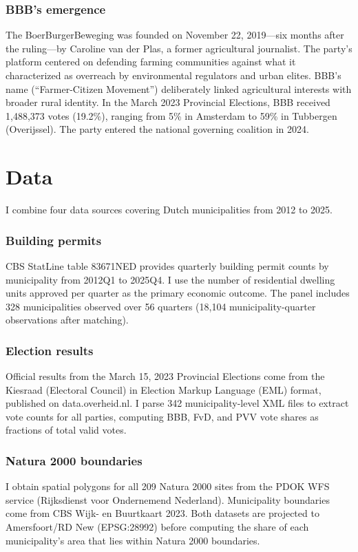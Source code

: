 \documentclass[12pt]{article}
\begin{document}
\subsubsection*{BBB's emergence} The BoerBurgerBeweging was founded on November 22, 2019---six months after the ruling---by Caroline van der Plas, a former agricultural journalist. The party's platform centered on defending farming communities against what it characterized as overreach by environmental regulators and urban elites. BBB's name (``Farmer-Citizen Movement'') deliberately linked agricultural interests with broader rural identity. In the March 2023 Provincial Elections, BBB received 1,488,373 votes (19.2\%), ranging from 5\% in Amsterdam to 59\% in Tubbergen (Overijssel). The party entered the national governing coalition in 2024.

\section{Data}

I combine four data sources covering Dutch municipalities from 2012 to 2025.

\subsubsection*{Building permits} CBS StatLine table 83671NED provides quarterly building permit counts by municipality from 2012Q1 to 2025Q4. I use the number of residential dwelling units approved per quarter as the primary economic outcome. The panel includes 328 municipalities observed over 56 quarters (18,104 municipality-quarter observations after matching).

\subsubsection*{Election results} Official results from the March 15, 2023 Provincial Elections come from the Kiesraad (Electoral Council) in Election Markup Language (EML) format, published on data.overheid.nl. I parse 342 municipality-level XML files to extract vote counts for all parties, computing BBB, FvD, and PVV vote shares as fractions of total valid votes.

\subsubsection*{Natura 2000 boundaries} I obtain spatial polygons for all 209 Natura 2000 sites from the PDOK WFS service (Rijksdienst voor Ondernemend Nederland). Municipality boundaries come from CBS Wijk- en Buurtkaart 2023. Both datasets are projected to Amersfoort/RD New (EPSG:28992) before computing the share of each municipality's area that lies within Natura 2000 boundaries.
\end{document}
